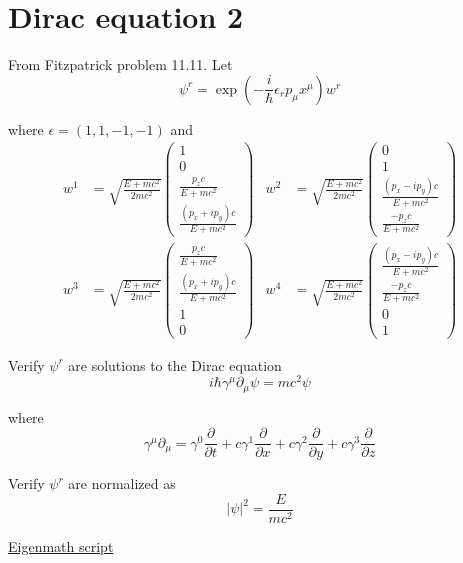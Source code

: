 

\section*{Dirac equation 2}

From Fitzpatrick problem 11.11.
Let
\begin{equation*}
\psi^r=\exp\left(-\frac{i}{\hbar}\epsilon_rp_\mu x^\mu\right)w^r
\end{equation*}

where $\epsilon=(1,1,-1,-1)$ and
\begin{align*}
w^1&=\sqrt{\frac{E+mc^2}{2mc^2}}
\begin{pmatrix}1\\0\\\frac{p_zc}{E+mc^2}\\\frac{(p_x+ip_y)c}{E+mc^2}\end{pmatrix}
&
w^2&=\sqrt{\frac{E+mc^2}{2mc^2}}
\begin{pmatrix}0\\1\\\frac{(p_x-ip_y)c}{E+mc^2}\\\frac{-p_zc}{E+mc^2}\end{pmatrix}
\\[1ex]
w^3&=\sqrt{\frac{E+mc^2}{2mc^2}}
\begin{pmatrix}\frac{p_zc}{E+mc^2}\\\frac{(p_x+ip_y)c}{E+mc^2}\\1\\0\end{pmatrix}
&
w^4&=\sqrt{\frac{E+mc^2}{2mc^2}}
\begin{pmatrix}\frac{(p_x-ip_y)c}{E+mc^2}\\\frac{-p_zc}{E+mc^2}\\0\\1\end{pmatrix}
\end{align*}

Verify $\psi^r$ are solutions to the Dirac equation
\begin{equation*}
i\hbar\gamma^\mu\partial_\mu\psi=mc^2\psi
\end{equation*}

where
\begin{equation*}
\gamma^\mu\partial_\mu
=\gamma^0\frac{\partial}{\partial t}
+c\gamma^1\frac{\partial}{\partial x}
+c\gamma^2\frac{\partial}{\partial y}
+c\gamma^3\frac{\partial}{\partial z}
\end{equation*}

Verify $\psi^r$ are normalized as
\begin{equation*}
|\psi|^2=\frac{E}{mc^2}
\end{equation*}

\href{https://georgeweigt.github.io/examples/dirac-equation-2-demo.html}{Eigenmath script}


